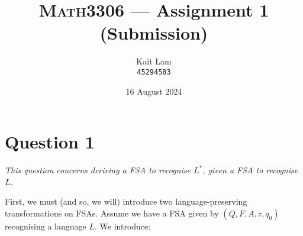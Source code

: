 \documentclass[a4paper]{article}
\author{Kait Lam \\ \small \texttt{45294583}}
\title{\textsc{Math3306} --- Assignment 1 (Submission)}
\date{16 August 2024}
\begin{document}
\maketitle


\section*{Question 1}
\begin{center}
  \textit{This question concerns deriving a FSA to recognise $L^*$, given a FSA to recognise $L$.}
\end{center}

\noindent First, we must (and so, we will)
introduce two language-preserving transformations on FSAs.
Assume we have a FSA given by $(Q, F, A, \tau, q_0)$ recognising a language $L$.
We introduce:
\end{document}
